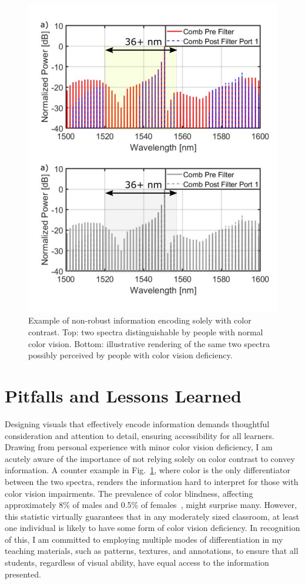 \begin{figure}[!ht]%
    \includegraphics[width=\linewidth]{../../fig/color.pdf}
    \caption{Example of non-robust information encoding solely with color contrast. Top: two spectra distinguishable by people with normal color vision. Bottom: illustrative rendering of the same two spectra possibly perceived by people with color vision deficiency.}
    \label{fig:color}
\end{figure}

\section{Pitfalls and Lessons Learned}
Designing visuals that effectively encode information demands thoughtful consideration and attention to detail, ensuring accessibility for all learners. Drawing from personal experience with minor color vision deficiency, I am acutely aware of the importance of not relying solely on color contrast to convey information. A counter example in Fig.~\ref{fig:color}, where color is the only differentiator between the two spectra, renders the information hard to interpret for those with color vision impairments. The prevalence of color blindness, affecting approximately 8\% of males and 0.5\% of females~\cite{TypesColourBlindness}, might surprise many. However, this statistic virtually guarantees that in any moderately sized classroom, at least one individual is likely to have some form of color vision deficiency. In recognition of this, I am committed to employing multiple modes of differentiation in my teaching materials, such as patterns, textures, and annotations, to ensure that all students, regardless of visual ability, have equal access to the information presented.

